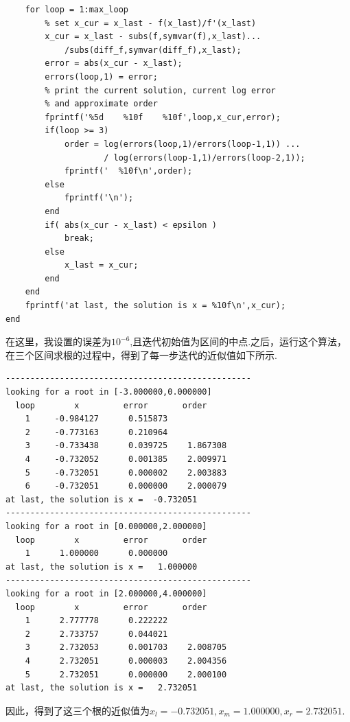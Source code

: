 \documentclass[12pt,a4paper,utf8]{ctexart}
\begin{document}
\begin{enumerate}
\begin{itemize}
\begin{lstlisting}[frame=single]
    % main loop
    for loop = 1:max_loop
        % set x_cur = x_last - f(x_last)/f'(x_last)
        x_cur = x_last - subs(f,symvar(f),x_last)...
            /subs(diff_f,symvar(diff_f),x_last);
        error = abs(x_cur - x_last);
        errors(loop,1) = error;
        % print the current solution, current log error 
        % and approximate order
        fprintf('%5d    %10f    %10f',loop,x_cur,error);
        if(loop >= 3)
            order = log(errors(loop,1)/errors(loop-1,1)) ...
                    / log(errors(loop-1,1)/errors(loop-2,1));
            fprintf('  %10f\n',order);
        else
            fprintf('\n');
        end
        if( abs(x_cur - x_last) < epsilon )
            break;
        else
            x_last = x_cur;
        end
    end
    fprintf('at last, the solution is x = %10f\n',x_cur);
end
\end{lstlisting}
    在这里，我设置的误差为$10^{-6}$,且迭代初始值为区间的中点.之后，运行这个算法，在三个区间求根的过程中，得到了每一步迭代的近似值如下所示.
\begin{lstlisting}
--------------------------------------------------
looking for a root in [-3.000000,0.000000]
  loop        x         error       order
    1     -0.984127      0.515873
    2     -0.773163      0.210964
    3     -0.733438      0.039725    1.867308
    4     -0.732052      0.001385    2.009971
    5     -0.732051      0.000002    2.003883
    6     -0.732051      0.000000    2.000079
at last, the solution is x =  -0.732051
--------------------------------------------------
looking for a root in [0.000000,2.000000]
  loop        x         error       order
    1      1.000000      0.000000
at last, the solution is x =   1.000000
--------------------------------------------------
looking for a root in [2.000000,4.000000]
  loop        x         error       order
    1      2.777778      0.222222
    2      2.733757      0.044021
    3      2.732053      0.001703    2.008705
    4      2.732051      0.000003    2.004356
    5      2.732051      0.000000    2.000100
at last, the solution is x =   2.732051
\end{lstlisting}
    \par    
    因此，得到了这三个根的近似值为$x_l = -0.732051, x_m = 1.000000, x_r = 2.732051.$


\end{itemize}
\end{enumerate}
\end{document}
